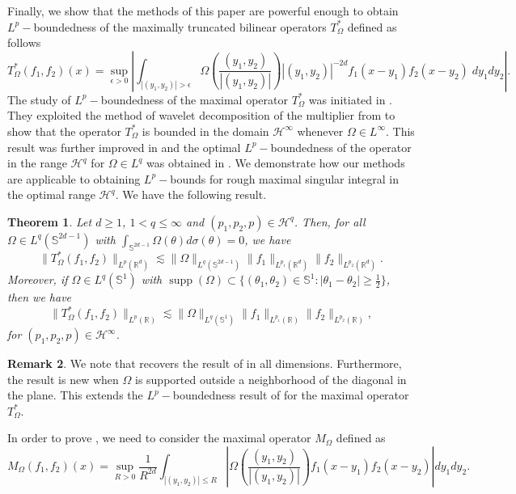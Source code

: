 \documentclass[a4paper,reqno]{amsart}
\newcommand{\R}{{\mathbb R}}       %
\newcommand{\Sp}{{\mathbb S}}
\newcommand{\supp}[1]{\operatorname{supp}(#1)}   %
\newtheorem{theorem}{Theorem}[section]
\theoremstyle{definition}
\newtheorem{brem}[theorem]{Remark}
\numberwithin{equation}{section}
\begin{document}
Finally, we show that the methods of this paper are powerful enough to obtain $L^p-$boundedness of the maximally truncated bilinear operators $T_\Omega^*$ defined as follows
\[T_{\Omega}^*(f_1,f_2)(x)=\sup_{\epsilon>0}\left|\int_{|(y_1,y_2)|>\epsilon}\Omega\left(\frac{(y_1,y_2)}{|(y_1,y_2)|}\right){|(y_1,y_2)|^{-2d}}f_1(x-y_1)f_2(x-y_2)\;dy_1dy_2\right|.\]
The study of $L^p-$boundedness of the maximal operator $T_\Omega^*$ was initiated in \cite{BH2019}. They exploited the method of wavelet decomposition of the multiplier from \cite{GHH2018} to show that the operator $T_{\Omega}^*$ is bounded in the domain $\mathcal{H}^\infty$ whenever $\Omega\in L^\infty$. This result was further improved in \cite{GHHP2024ae} and the optimal $L^p-$boundedness of the operator in the range  $\mathcal{H}^q$ for $\Omega\in L^q$ was obtained in \cite{Park2025}. We demonstrate how our methods are applicable to obtaining $L^p-$bounds for rough maximal singular integral in the optimal range $\mathcal{H}^q$. We have the following result. 
\begin{theorem}\label{Thm:Roughmaximal}
	Let $d\geq1$, $1<q\leq\infty$ and $(p_1,p_2,p)\in\mathcal{H}^q$. Then, for all $\Omega\in L^q(\Sp^{2d-1})$ with $\int_{\Sp^{2d-1}}\Omega(\theta)d\sigma(\theta)=0$, we have
	\[\|T_\Omega^*(f_1,f_2)\|_{L^p(\R^d)}\lesssim\|\Omega\|_{L^q(\Sp^{2d-1})}\|f_1\|_{L^{p_1}(\R^d)}\|f_2\|_{L^{p_2}(\R^d)}.\]
	Moreover, if $\Omega\in L^q(\Sp^{1})$ with $\supp{\Omega}\subset \{(\theta_1,\theta_2)\in\Sp^1:|\theta_1-\theta_2|\geq\frac{1}{2}\}$, then we have
	\[\|T_\Omega^*(f_1,f_2)\|_{L^p(\R)}\lesssim\|\Omega\|_{L^q(\Sp^{1})}\|f_1\|_{L^{p_1}(\R)}\|f_2\|_{L^{p_2}(\R)},\]
	for $(p_1,p_2,p)\in\mathcal{H}^\infty$.
\end{theorem}
\begin{brem}
We note that  recovers the result of \cite{Park2025} in all dimensions. Furthermore, the result is new when $\Omega$ is supported outside a neighborhood of the diagonal in the plane. This extends the $L^p-$boundedness result of  for the maximal operator $T_\Omega^*$.
\end{brem}
In order to prove , we need to consider the maximal operator $M_\Omega$ defined as
\[M_\Omega(f_1,f_2)(x)=\sup_{R>0}\frac{1}{R^{2d}}\int_{|(y_1,y_2)|\leq R}\left|\Omega\left(\frac{(y_1,y_2)}{|(y_1,y_2)|}\right)f_1(x-y_1)f_2(x-y_2)\right|dy_1dy_2.\]
\end{document}
